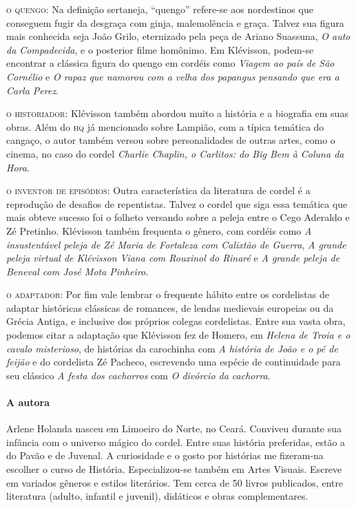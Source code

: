 \documentclass[11pt]{extarticle}
\begin{document}
\noindent\textsc{o quengo}: Na definição sertaneja, ``quengo'' refere-se aos nordestinos que conseguem fugir da desgraça com ginja, malemolência e graça. Talvez sua figura mais conhecida seja João Grilo, eternizado pela peça de Ariano Suassuna, \textit{O auto da Compadecida}, e o posterior filme homônimo. Em Klévisson, podem-se encontrar a clássica figura do quengo em cordéis como \textit{Viagem ao país de São Cornélio} e \textit{O rapaz que namorou com a velha dos papangus pensando que era a Carla Perez}. 


\noindent\textsc{o historiador}: Klévisson também abordou muito a história e a biografia em suas obras. Além do \textsc{hq} já mencionado sobre Lampião, com a típica temática do cangaço, o autor também versou sobre personalidades de outras artes, como o cinema, no caso do cordel \textit{Charlie Chaplin, o Carlitos: do Big Bem à Coluna da Hora}.

\noindent\textsc{o inventor de episódios}: Outra característica da literatura de cordel é a reprodução de desafios de repentistas. Talvez o cordel que siga essa temática que mais obteve sucesso foi o folheto versando sobre a peleja entre o Cego Aderaldo e Zé Pretinho. Klévisson também frequenta o gênero, com cordéis como \textit{A insustentável
peleja de Zé Maria de Fortaleza com Calixtão de Guerra}, \textit{A grande peleja virtual de Klévisson Viana com Rouxinol do Rinaré} e \textit{A grande peleja de Beneval com José Mota Pinheiro}.

\noindent\textsc{o adaptador}: Por fim vale lembrar o frequente hábito entre os cordelistas de adaptar históricas clássicas de romances, de lendas medievais europeias ou da Grécia Antiga, e inclusive dos próprios colegas cordelistas. Entre sua vasta obra, podemos citar a adaptação que Klévisson fez de Homero, em \textit{Helena de Troia e o cavalo misterioso}, de histórias da carochinha com \textit{A história de João e o pé de feijão} e do cordelista Zé Pacheco, escrevendo uma espécie de continuidade para seu clássico \textit{A festa dos cachorros} com \textit{O divórcio da cachorra}.

\paragraph{A autora}
Arlene Holanda nasceu em Limoeiro do Norte, no Ceará. Conviveu durante sua infância com o universo mágico do cordel. Entre suas história preferidas, estão a do Pavão e de
Juvenal. A curiosidade e o gosto por histórias me fizeram-na escolher o curso de História. Especializou-se também em Artes Visuais. Escreve em variados gêneros e estilos literários. Tem cerca de 50 livros publicados, entre literatura (adulto, infantil e juvenil), didáticos e obras complementares.
\end{document}
